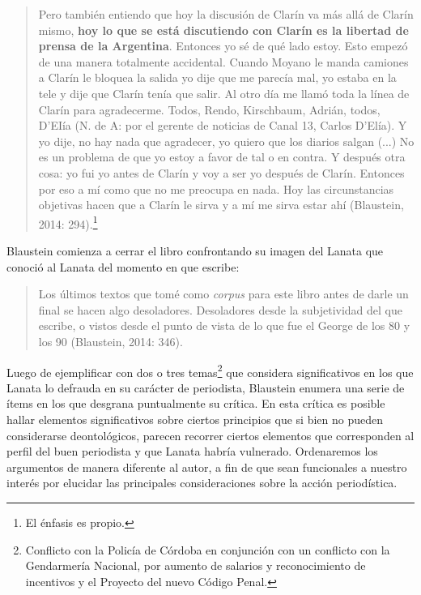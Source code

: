 \begin{quote}
Pero también entiendo que hoy la discusión de Clarín va más allá de Clarín mismo, \textbf{hoy lo que se está discutiendo con Clarín es la libertad de prensa de la Argentina}. Entonces yo sé de qué lado estoy. Esto empezó de una manera totalmente accidental. Cuando Moyano le manda camiones a Clarín le bloquea la salida yo dije que me parecía mal, yo estaba en la tele y dije que Clarín tenía que salir. Al otro día me llamó toda la línea de Clarín para agradecerme. Todos, Rendo, Kirschbaum, Adrián, todos, D'EIía (N. de A: por el gerente de noticias de Canal 13, Carlos D'Elía). Y yo dije, no hay nada que agradecer, yo quiero que los diarios salgan (...) No es un problema de que yo estoy a favor de tal o en contra. Y después otra cosa: yo fui yo antes de Clarín y voy a ser yo después de Clarín. Entonces por eso a mí como que no me preocupa en nada. Hoy las circunstancias objetivas hacen que a Clarín le sirva y a mí me sirva estar ahí (Blaustein, 2014: 294).\footnote{El énfasis es propio.}
\end{quote}

Blaustein comienza a cerrar el libro confrontando su imagen del Lanata que conoció al Lanata del momento en que escribe:

\begin{quote}
Los últimos textos que tomé como \emph{corpus} para este libro antes de darle un final se hacen algo desoladores. Desoladores desde la subjetividad del que escribe, o vistos desde el punto de vista de lo que fue el George de los 80 y los 90 (Blaustein, 2014: 346).
\end{quote}

Luego de ejemplificar con dos o tres temas\footnote{Conflicto con la Policía de Córdoba en conjunción con un conflicto con la Gendarmería Nacional, por aumento de salarios y reconocimiento de incentivos y el Proyecto del nuevo Código Penal.} que considera significativos en los que Lanata lo defrauda en su carácter de periodista, Blaustein enumera una serie de ítems en los que desgrana puntualmente su crítica. En esta crítica es posible hallar elementos significativos sobre ciertos principios que si bien no pueden considerarse deontológicos, parecen recorrer ciertos elementos que corresponden al perfil del buen periodista y que Lanata habría vulnerado. Ordenaremos los argumentos de manera diferente al autor, a fin de que sean funcionales a nuestro interés por elucidar las principales consideraciones sobre la acción periodística.

